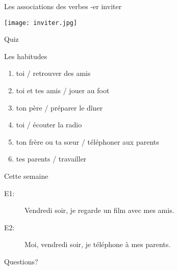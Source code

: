 \documentclass{beamer}
\begin{document}
  \begin{frame}{Les associations des verbes -er}
    \centering
    inviter

    \texttt{[image: inviter.jpg]}
  \end{frame}

  \begin{frame}{}
    \begin{center}
      \Large Quiz
    \end{center}
  \end{frame}

  \begin{frame}{Les habitudes}
    \begin{enumerate}
      \item toi / retrouver des amis
      \item toi et tes amis / jouer au foot
      \item ton père / préparer le dîner
      \item toi / écouter la radio
      \item ton frère ou ta sœur / téléphoner aux parents
      \item tes parents / travailler
    \end{enumerate}
  \end{frame}

  \begin{frame}{Cette semaine}
    \begin{description}
      \item[E1:] Vendredi soir, je regarde un film avec mes amis.
      \item[E2:] Moi, vendredi soir, je téléphone à mes parents.
    \end{description}

  \end{frame}

  \begin{frame}{}
    \begin{center}
      \Large Questions?
    \end{center}
  \end{frame}
\end{document}
